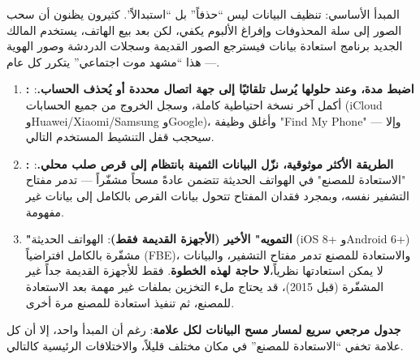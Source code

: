 


المبدأ الأساسي: تنظيف البيانات ليس “حذفاً” بل “استبدالاً”. كثيرون يظنون أن سحب الصور إلى سلة المحذوفات وإفراغ الألبوم يكفي، لكن بعد بيع الهاتف، يستخدم المالك الجديد برنامج استعادة بيانات فيسترجع الصور القديمة وسجلات الدردشة وصور الهوية — هذا “مشهد موت اجتماعي” يتكرر كل عام.

\begin{enumerate}
  \item \textbf{: اضبط مدة، وعند حلولها يُرسل تلقائيًا إلى جهة اتصال محددة أو يُحذف الحساب.}: أكمل آخر نسخة احتياطية كاملة، وسجل الخروج من جميع الحسابات (iCloud وHuawei/Xiaomi/Samsung وGoogle)، وأغلق وظيفة "Find My Phone" — وإلا سيحجب قفل التنشيط المستخدم التالي.
  \item \textbf{: الطريقة الأكثر موثوقية، نزّل البيانات الثمينة بانتظام إلى قرص صلب محلي.}: "الاستعادة للمصنع" في الهواتف الحديثة تتضمن عادةً مسحاً مشفّراً — تدمر مفتاح التشفير نفسه، وبمجرد فقدان المفتاح تتحول بيانات القرص بالكامل إلى بيانات غير مفهومة.
  \item \textbf{"التمويه" الأخير (الأجهزة القديمة فقط)}: الهواتف الحديثة (iOS 8+ وAndroid 6+) مشفّرة بالكامل افتراضياً (FBE)، والاستعادة للمصنع تدمر مفتاح التشفير، والبيانات لا يمكن استعادتها نظرياً،\textbf{لا حاجة لهذه الخطوة}. فقط للأجهزة القديمة جداً غير المشفّرة (قبل 2015)، قد يحتاج ملء التخزين بملفات غير مهمة بعد الاستعادة للمصنع، ثم تنفيذ استعادة للمصنع مرة أخرى.
\end{enumerate}

\textbf{جدول مرجعي سريع لمسار مسح البيانات لكل علامة}: رغم أن المبدأ واحد، إلا أن كل علامة تخفي “الاستعادة للمصنع” في مكان مختلف قليلاً، والاختلافات الرئيسية كالتالي.

